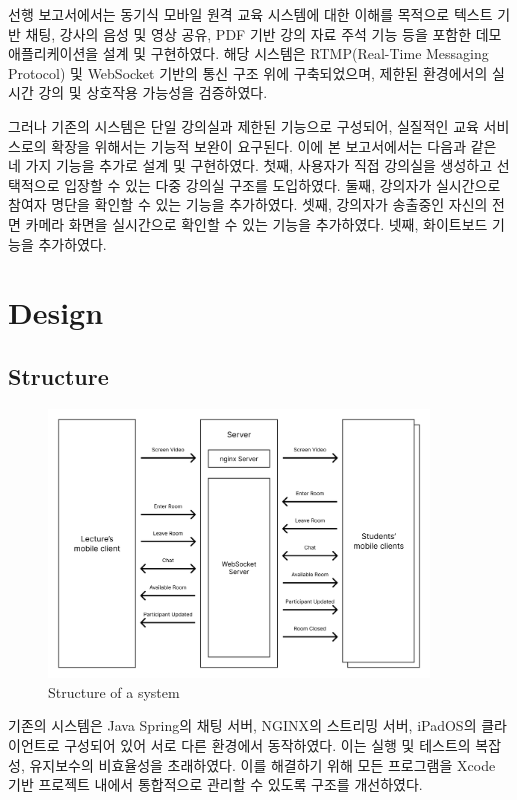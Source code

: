 \documentclass[pdflatex,sn-mathphys-num]{sn-jnl}%
\theoremstyle{thmstyleone}%
\theoremstyle{thmstyletwo}%
\theoremstyle{thmstylethree}%
\begin{document}
선행 보고서에서는 동기식 모바일 원격 교육 시스템에 대한 이해를 목적으로 텍스트 기반 채팅, 강사의 음성 및 영상 공유, PDF 기반 강의 자료 주석 기능 등을 포함한 데모 애플리케이션을 설계 및 구현하였다. 해당 시스템은 RTMP(Real-Time Messaging Protocol)\cite{RTMP} 및 WebSocket 기반의 통신 구조 위에 구축되었으며, 제한된 환경에서의 실시간 강의 및 상호작용 가능성을 검증하였다.

그러나 기존의 시스템은 단일 강의실과 제한된 기능으로 구성되어, 실질적인 교육 서비스로의 확장을 위해서는 기능적 보완이 요구된다. 이에 본 보고서에서는 다음과 같은 네 가지 기능을 추가로 설계 및 구현하였다. 첫째, 사용자가 직접 강의실을 생성하고 선택적으로 입장할 수 있는 다중 강의실 구조를 도입하였다. 둘째, 강의자가 실시간으로 참여자 명단을 확인할 수 있는 기능을 추가하였다. 셋째, 강의자가 송출중인 자신의 전면 카메라 화면을 실시간으로 확인할 수 있는 기능을 추가하였다. 넷째, 화이트보드 기능을 추가하였다.

\section{Design}\label{sec2}

\subsection{Structure}\label{subsec1}

\begin{figure}[h]
\centering
\includegraphics[width=0.9\textwidth]{architecture_of_system.png}
\caption{Structure of a system}\label{fig1}
\end{figure}

기존의 시스템은 Java Spring\cite{Spring}의 채팅 서버, NGINX\cite{NGINX}의 스트리밍 서버, iPadOS의 클라이언트로 구성되어 있어 서로 다른 환경에서 동작하였다. 이는 실행 및 테스트의 복잡성, 유지보수의 비효율성을 초래하였다. 이를 해결하기 위해 모든 프로그램을 Xcode\cite{Xcode} 기반 프로젝트 내에서 통합적으로 관리할 수 있도록 구조를 개선하였다.
\end{document}
